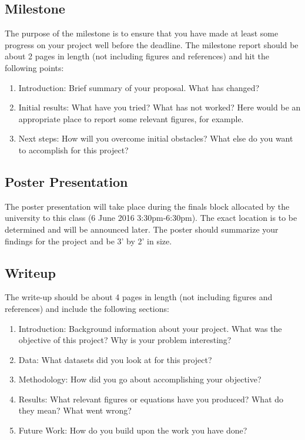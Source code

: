 \documentclass[11pt,onecolumn]{article}
\begin{document}
\subsection{Milestone}
The purpose of the milestone is to ensure that you have made at least some progress on your project well before the deadline.  The milestone report should be about 2 pages in length (not including figures and references) and hit the following points:
\begin{enumerate}
	\item Introduction: Brief summary of your proposal. What has changed? 
	\item Initial results: What have you tried? What has not worked? Here would be an appropriate place to report some relevant figures, for example. 
	\item Next steps: How will you overcome initial obstacles? What else do you want to accomplish for this project?
\end{enumerate}

\subsection{Poster Presentation}
The poster presentation will take place during the finals block allocated by the university to this class (6 June 2016 3:30pm-6:30pm). The exact location is to be determined and will be announced later. The poster should summarize your findings for the project and be 3' by 2' in size.

\subsection{Writeup}
The write-up should be about 4 pages in length (not including figures and references) and include the following sections:
\begin{enumerate}
	\item Introduction: Background information about your project. What was the objective of this project? Why is your problem interesting?
	\item Data: What datasets did you look at for this project? 
	\item Methodology: How did you go about accomplishing your objective? 
	\item Results: What relevant figures or equations have you produced? What do they mean? What went wrong?
	\item Future Work: How do you build upon the work you have done?
\end{enumerate}
\end{document}
